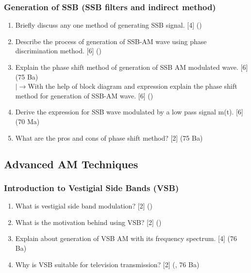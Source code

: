 \documentclass[12pt]{article}
\newcommand{\lb}{\\$\left|\rightarrow\right.$}
\begin{document}
    \subsubsection{Generation of SSB (SSB filters and indirect method)}
      \begin{enumerate}
        \item Briefly discuss any one method of generating SSB signal. \hfill [4] ()

        \item Describe the process of generation of SSB-AM wave using phase discrimination method. \hfill [6] ()

        \item Explain the phase shift method of generation of SSB AM modulated wave. \hfill [6] (75 Ba)
        \lb With the help of block diagram and expression explain the phase shift method for generation of SSB-AM wave. \hfill [6] ()

        \item Derive the expression for SSB wave modulated by a low pass signal m(t). \hfill [6] (70 Ma)

        \item What are the pros and cons of phase shift method? \hfill [2] (75 Ba)
      \end{enumerate}

  \subsection{Advanced AM Techniques}
    \subsubsection{Introduction to Vestigial Side Bands (VSB)}
      \begin{enumerate}
        \item What is vestigial side band modulation? \hfill [2] ()

        \item What is the motivation behind using VSB? \hfill [2] ()

        \item Explain about generation of VSB AM with its frequency spectrum. \hfill [4] (76 Ba)

        \item Why is VSB suitable for television transmission? \hfill [2] (, 76 Ba)
      \end{enumerate}
\end{document}
